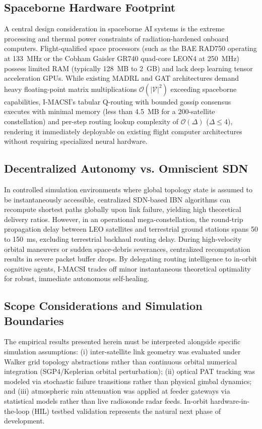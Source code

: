 \documentclass[journal]{IEEEtran}
\begin{document}
\subsection{Spaceborne Hardware Footprint}
A central design consideration in spaceborne AI systems is the extreme processing and thermal power constraints of radiation-hardened onboard computers. Flight-qualified space processors (such as the BAE RAD750 operating at 133~MHz or the Cobham Gaisler GR740 quad-core LEON4 at 250~MHz) possess limited RAM (typically 128~MB to 2~GB) and lack deep learning tensor acceleration GPUs. While existing MADRL and GAT architectures demand heavy floating-point matrix multiplications $\mathcal{O}(|\mathcal{V}|^2)$ exceeding spaceborne capabilities, I-MACSI's tabular Q-routing with bounded gossip consensus executes with minimal memory (less than 4.5~MB for a 200-satellite constellation) and per-step routing lookup complexity of $\mathcal{O}(\Delta)$ ($\Delta \le 4$), rendering it immediately deployable on existing flight computer architectures without requiring specialized neural hardware.

\subsection{Decentralized Autonomy vs. Omniscient SDN}
In controlled simulation environments where global topology state is assumed to be instantaneously accessible, centralized SDN-based IBN algorithms can recompute shortest paths globally upon link failure, yielding high theoretical delivery ratios. However, in an operational mega-constellation, the round-trip propagation delay between LEO satellites and terrestrial ground stations spans 50 to 150~ms, excluding terrestrial backhaul routing delay. During high-velocity orbital maneuvers or sudden space-debris severances, centralized recomputation results in severe packet buffer drops. By delegating routing intelligence to in-orbit cognitive agents, I-MACSI trades off minor instantaneous theoretical optimality for robust, immediate autonomous self-healing.

\subsection{Scope Considerations and Simulation Boundaries}
The empirical results presented herein must be interpreted alongside specific simulation assumptions: (i) inter-satellite link geometry was evaluated under Walker grid topology abstractions rather than continuous orbital numerical integration (SGP4/Keplerian orbital perturbation); (ii) optical PAT tracking was modeled via stochastic failure transitions rather than physical gimbal dynamics; and (iii) atmospheric rain attenuation was applied at feeder gateways via statistical models rather than live radiosonde radar feeds. In-orbit hardware-in-the-loop (HIL) testbed validation represents the natural next phase of development.
\end{document}

